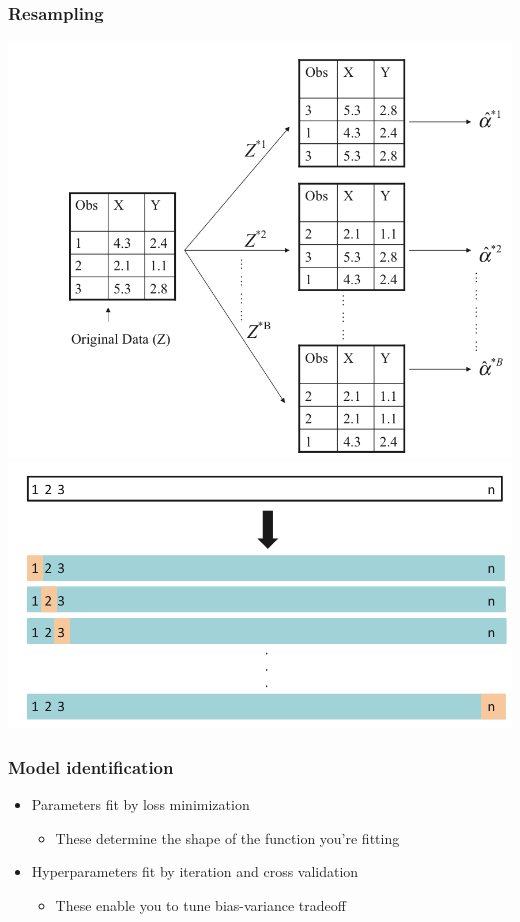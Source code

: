 \documentclass[mathserif, aspectratio=169]{beamer}
\begin{document}
\begin{frame}
	\frametitle{Resampling}
	\begin{center}
		\includegraphics[height=0.65\textheight]{bootstrap}
		\includegraphics[height=0.5\textheight]{loocv}
	\end{center}
\end{frame}

\begin{frame}
	\frametitle{Model identification}
	\begin{itemize}
		\item Parameters fit by loss minimization
		\begin{itemize}
			\item These determine the shape of the function you're fitting
		\end{itemize}
		\item Hyperparameters fit by iteration and cross validation
		\begin{itemize}
			\item These enable you to tune bias-variance tradeoff
		\end{itemize}
	\end{itemize}
\end{frame}
\end{document}

